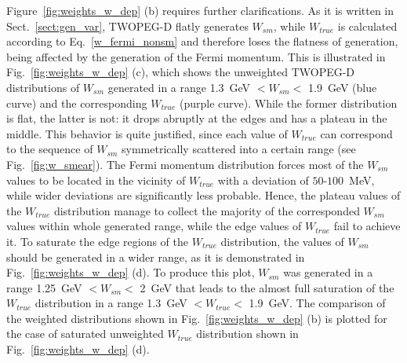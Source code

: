Figure~\ref{fig:weights_w_dep} (b) requires further clarifications. As it is written in Sect.~\ref{sect:gen_var}, TWOPEG-D flatly generates $W_{sm}$, while $W_{true}$ is calculated according to Eq.~\eqref{w_fermi_nonsm} and therefore loses the flatness of generation, being affected by the generation of the Fermi momentum. This is illustrated in Fig.~\ref{fig:weights_w_dep} (c), 
which shows the unweighted TWOPEG-D  distributions of $W_{sm}$ generated in a range 1.3~GeV $< W_{sm} <$ 1.9~GeV (blue curve) and the corresponding $W_{true}$ (purple curve).
While the former distribution is flat, the latter is not: it drops abruptly at the edges and has a plateau in the middle. This behavior is quite justified, since each value of $W_{true}$ can correspond to the sequence of  $W_{sm}$ symmetrically scattered into a certain range (see Fig.~\ref{fig:w_smear}). The Fermi momentum distribution forces most of the $W_{sm}$ values to be located in the vicinity of $W_{true}$ with a deviation of $50$-$100$~MeV, while wider deviations are significantly less probable. Hence, the plateau values of the  $W_{true}$ distribution manage to collect the majority of the corresponded $W_{sm}$ values within whole generated range, while the edge values of $W_{true}$  fail to achieve it. To saturate the edge regions of the $W_{true}$ distribution, the values of $W_{sm}$ should be generated in a wider range, as it is demonstrated in Fig.~\ref{fig:weights_w_dep} (d). To produce this plot, $W_{sm}$ was generated in a range 1.25~GeV $< W_{sm} <$ 2~GeV that leads to the almost full saturation of the $W_{true}$ distribution in a range 1.3~GeV $< W_{true} <$ 1.9~GeV. The comparison of the weighted distributions shown in Fig.~\ref{fig:weights_w_dep} (b) is plotted for the case of saturated unweighted $W_{true}$ distribution shown in Fig.~\ref{fig:weights_w_dep} (d).


